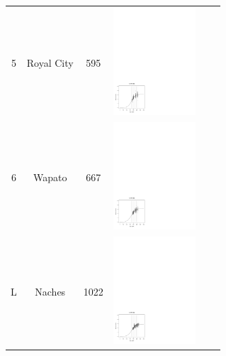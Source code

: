\begin{tabular}{cccccc}
		{5}		& Royal City	& 595 	& \includegraphics[height=40mm]{graphics/location_5.pdf} &  &  \\
		{6}		& Wapato	& 667  	& \includegraphics[height=40mm]{graphics/location_6.pdf} &  &  \\
		{L}		& Naches	& 1022 	& \includegraphics[height=40mm]{graphics/location_L.pdf} &  &  \\
		\hline
		\end{tabular}
			